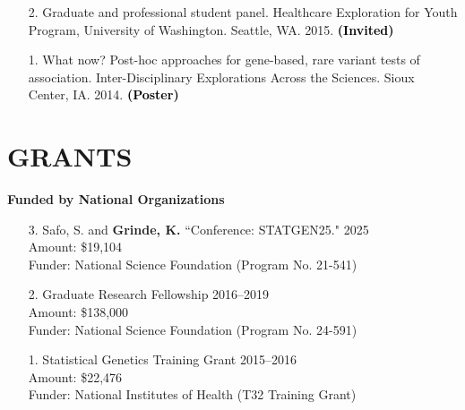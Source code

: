 \documentclass[margin]{res}
\newcommand{\annotate}[1]{\textcolor{black}{\textbf{(#1)}}}
\newcommand{\annotateItem}[1]{
	\begin{itemize} \vspace{-0.1cm}
	\item[] 
	\begin{footnotesize}\textcolor{black}{(#1)}\end{footnotesize}
	\end{itemize} \vspace{-0.1cm}
}
\begin{document}
\begin{resume}
\begin{itemize}
\item[2.] Graduate and professional student panel. 
Healthcare Exploration for Youth Program, University of Washington. Seattle, WA. 2015. 
\annotate{Invited}

\item[1.] %
What now? Post-hoc approaches for gene-based, rare variant tests of association. 
Inter-Disciplinary Explorations Across the Sciences. Sioux Center, IA. 2014.  
\annotate{Poster}\\%

\end{itemize}




\section{GRANTS}

\textbf{Funded by National Organizations}
\begin{itemize}
\item[3.] Safo, S. and \textbf{Grinde, K.} ``Conference: STATGEN25."  \hfill 2025 \\ 
Amount: \$19,104 \\ %
Funder: National Science Foundation (Program No. 21-541)
	
\item[2.] Graduate Research Fellowship \hfill 2016--2019 \\
Amount: \$138,000 \\
Funder: National Science Foundation (Program No. 24-591)

\item[1.] Statistical Genetics Training Grant \hfill 2015--2016  \\
Amount: \$22,476 \\
Funder: National Institutes of Health (T32 Training Grant) %
\end{itemize}


\end{resume}
\end{document}
